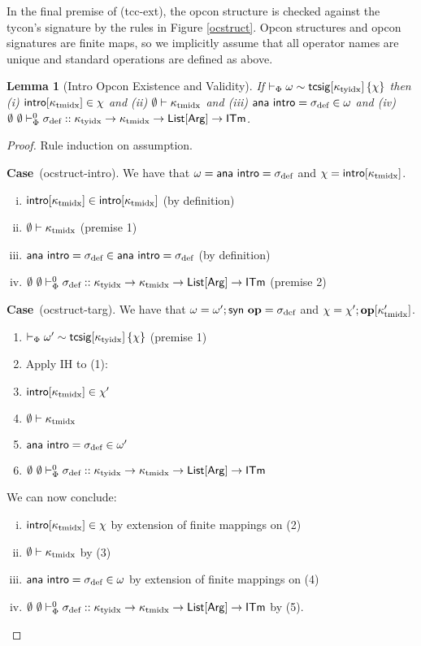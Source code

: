 \documentclass[12pt]{article}
\newtheorem{lemma}{Lemma}
\newcommand{\pfcase}[1]{\textbf{Case}~#1. }
\begin{document}
In the final premise of (tcc-ext), the opcon structure is checked against the tycon's signature by the rules in Figure \ref{ocstruct}. Opcon structures and opcon signatures are finite maps, so we implicitly assume that all operator names are unique and standard operations are defined as above.

\begin{lemma}[Intro Opcon Existence and Validity]
\label{lemma:intro-opcon-existence-and-validity}
If $\vdash_\Phi \omega \sim {\sf tcsig}[\kappa_\text{tyidx}]\,\{\chi\}$ then (i) ${\sf intro}[\kappa_\text{tmidx}] \in \chi$ and (ii) $\emptyset \vdash \kappa_\text{tmidx}$ and (iii) ${\sf ana~intro}=\sigma_\text{def}\in\omega$ and (iv) $\emptyset~\emptyset \vdash_{\Phi}^{0} \sigma_\text{def} :: \kappa_\text{tyidx} \rightarrow \kappa_\text{tmidx} \rightarrow {\sf List}[{\sf Arg}] \rightarrow {\sf ITm}$.
\end{lemma}
\begin{proof}
Rule induction on assumption. 

\pfcase{(ocstruct-intro)} We have that $\omega={\sf ana~intro}=\sigma_\text{def}$ and $\chi={\sf intro}[\kappa_\text{tmidx}]$.

\begin{enumerate}[(i)]
\item ${\sf intro}[\kappa_\text{tmidx}] \in {\sf intro}[\kappa_\text{tmidx}]$ (by definition)
\item $\emptyset \vdash \kappa_\text{tmidx}$  (premise 1)
\item  ${\sf ana~intro}=\sigma_\text{def}\in{\sf ana~intro}=\sigma_\text{def}$ (by definition)
\item $\emptyset~\emptyset \vdash_{\Phi}^{0} \sigma_\text{def} :: \kappa_\text{tyidx} \rightarrow \kappa_\text{tmidx} \rightarrow {\sf List}[{\sf Arg}] \rightarrow {\sf ITm}$ (premise 2)
\end{enumerate}

\pfcase{(ocstruct-targ)} We have that $\omega=\omega'; {\sf syn}~\textbf{op}=\sigma_\text{def}$ and  $\chi=\chi'; \textbf{op}[\kappa_\text{tmidx}']$.
\begin{enumerate}[(1)]
\item $\vdash_\Phi \omega' \sim {\sf tcsig}[\kappa_\text{tyidx}]\,\{\chi\}$ (premise 1)
\item[] Apply IH to (1):
\item ${\sf intro}[\kappa_\text{tmidx}] \in \chi'$
\item $\emptyset \vdash \kappa_\text{tmidx}$
\item ${\sf ana~intro}=\sigma_\text{def}\in\omega'$
\item $\emptyset~\emptyset \vdash_{\Phi}^{0} \sigma_\text{def} :: \kappa_\text{tyidx} \rightarrow \kappa_\text{tmidx} \rightarrow {\sf List}[{\sf Arg}] \rightarrow {\sf ITm}$
\end{enumerate}
We can now conclude:
\begin{enumerate}[(i)]
\item ${\sf intro}[\kappa_\text{tmidx}] \in \chi$ by extension of finite mappings on (2)
\item $\emptyset \vdash \kappa_\text{tmidx}$ by (3)
\item ${\sf ana~intro}=\sigma_\text{def}\in\omega$ by extension of finite mappings on (4)
\item $\emptyset~\emptyset \vdash_{\Phi}^{0} \sigma_\text{def} :: \kappa_\text{tyidx} \rightarrow \kappa_\text{tmidx} \rightarrow {\sf List}[{\sf Arg}] \rightarrow {\sf ITm}$ by (5).
\end{enumerate}
\end{proof}
\end{document}
